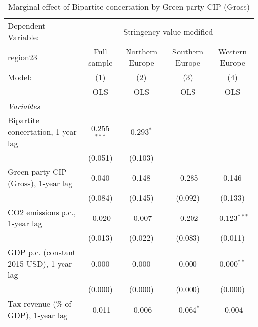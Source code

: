 
\begin{table}[htbp]
   \caption{Marginal effect of Bipartite concertation by Green party CIP (Gross)}
   \centering
   \begin{tabular}{lcccc}
      \toprule
      Dependent Variable: & \multicolumn{4}{c}{Stringency value modified}\\
      region23                                                                 & Full sample   & Northern Europe & Southern Europe & Western Europe \\   
      Model:                                                                   & (1)           & (2)             & (3)             & (4)\\  
                                                                               &  OLS          & OLS             & OLS             & OLS\\  
      \midrule
      \emph{Variables}\\
      Bipartite concertation, 1-year lag                                       & 0.255$^{***}$ & 0.293$^{*}$     &                 &   \\   
                                                                               & (0.051)       & (0.103)         &                 &   \\   
      Green party CIP (Gross), 1-year lag                                      & 0.040         & 0.148           & -0.285          & 0.146\\   
                                                                               & (0.084)       & (0.145)         & (0.092)         & (0.133)\\   
      CO2 emissions p.c., 1-year lag                                           & -0.020        & -0.007          & -0.202          & -0.123$^{***}$\\   
                                                                               & (0.013)       & (0.022)         & (0.083)         & (0.011)\\   
      GDP p.c. (constant 2015 USD), 1-year lag                                 & 0.000         & 0.000           & 0.000           & 0.000$^{**}$\\   
                                                                               & (0.000)       & (0.000)         & (0.000)         & (0.000)\\   
      Tax revenue (\% of GDP), 1-year lag                                      & -0.011        & -0.006          & -0.064$^{*}$    & -0.004\\   

\end{tabular}
\end{table}
